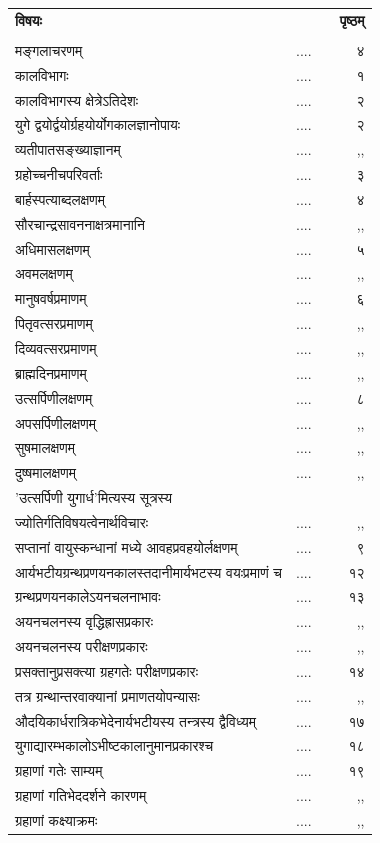 \documentclass[11pt, openany]{book}
\begin{document}
\begin{tabular}{llp{0.6cm}r}
\hspace{1cm} \textbf{विषयः} &&& \textbf{पृष्ठम्} \\
	&&&\\
मङ्गलाचरणम्  & ....&&  ४\\
कालविभागः & .... &&  १\\
कालविभागस्य क्षेत्रेऽतिदेशः  & ....&&  २\\
युगे द्वयोर्द्वयोर्ग्रहयोर्योगकालज्ञानोपायः  & ....&&  २\\
व्यतीपातसङ्ख्याज्ञानम्  & ....&&  ,,\\
ग्रहोच्चनीचपरिवर्ताः & ....&&  ३\\
बार्हस्पत्याब्दलक्षणम्  & ....&&  ४\\
सौरचान्द्रसावननाक्षत्रमानानि  & ....&&  ,,\\
अधिमासलक्षणम् & ....&&  ५\\
अवमलक्षणम् & ....&&  ,,\\
मानुषवर्षप्रमाणम् & ....&&  ६\\
पितृवत्सरप्रमाणम्  & ....&&  ,,\\
दिव्यवत्सरप्रमाणम्  & ....&&  ,,\\
ब्राह्मदिनप्रमाणम्  & ....&&  ,,\\
उत्सर्पिणीलक्षणम् & ....&&  ८\\
अपसर्पिणीलक्षणम् & ....&&  ,,\\
सुषमालक्षणम् & ....&&  ,,\\
दुष्षमालक्षणम्& ....&&  ,,\\
'उत्सर्पिणी युगार्ध'मित्यस्य सूत्रस्य\\ ज्योतिर्गतिविषयत्वेनार्थविचारः  & ....&&  ,,\\
सप्तानां वायुस्कन्धानां मध्ये आवहप्रवहयोर्लक्षणम्  & ....&&  ९ \\
आर्यभटीयग्रन्थप्रणयनकालस्तदानीमार्यभटस्य वयःप्रमाणं च & ....&&  १२ \\
ग्रन्थप्रणयनकालेऽयनचलनाभावः  & ....&&  १३\\
अयनचलनस्य वृद्धिह्रासप्रकारः & ....&&  ,,\\
अयनचलनस्य परीक्षणप्रकारः  & ....&&  ,,\\
प्रसक्तानुप्रसक्त्या ग्रहगतेः परीक्षणप्रकारः  & ....&&  १४\\
तत्र ग्रन्थान्तरवाक्यानां प्रमाणतयोपन्यासः & ....&&  ,,\\
औदयिकार्धरात्रिकभेदेनार्यभटीयस्य तन्त्रस्य द्वैविध्यम् & ....&&  १७\\
युगाद्यारम्भकालोऽभीष्टकालानुमानप्रकारश्च & ....&&  १८\\
ग्रहाणां गतेः साम्यम् & ....&&  १९\\
ग्रहाणां गतिभेददर्शने कारणम् & ....&&   ,,\\
ग्रहाणां कक्ष्याक्रमः & ....&&  ,,\\

\end{tabular}
\end{document}
